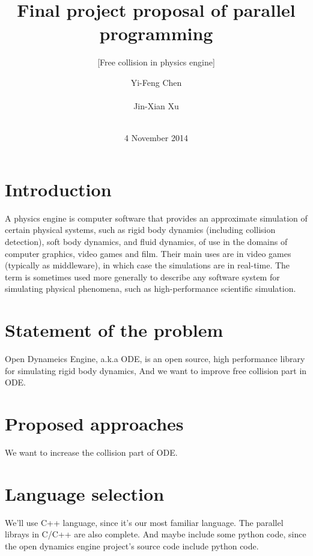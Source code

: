 \documentclass{acm_proc_article-sp}
\begin{document}
\title{Final project proposal of parallel programming}
\subtitle{[Free collision in physics engine]}
\author{
\alignauthor
Yi-Feng Chen\\
        \\
\alignauthor
Jin-Xian Xu\\
        \\
}
\date{4 November 2014}
\maketitle
\section{Introduction}
A physics engine is computer software that provides an approximate simulation of certain physical systems, such as rigid body dynamics (including collision detection), soft body dynamics, and fluid dynamics, of use in the domains of computer graphics, video games and film. Their main uses are in video games (typically as middleware), in which case the simulations are in real-time. The term is sometimes used more generally to describe any software system for simulating physical phenomena, such as high-performance scientific simulation.

\section{Statement of the problem}
Open Dynameics Engine, a.k.a ODE, is an open source, high performance library for simulating rigid body dynamics, And we want to improve free collision part in ODE.

\section{Proposed approaches}
We want to increase the collision part of ODE.

\section{Language selection}
We'll use C++ language, since it's our most familiar language. The parallel librays in C/C++ are also complete.
And maybe include some python code, since the open dynamics engine project's source code include python code.
\end{document}
